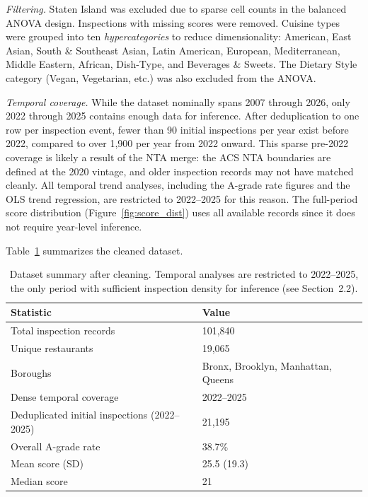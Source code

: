 \documentclass[11pt, twocolumn]{article}
\begin{document}
\textit{Filtering.} Staten Island was excluded due to sparse cell counts
in the balanced ANOVA design. Inspections with missing scores were
removed. Cuisine types were grouped into ten \textit{hypercategories}
to reduce dimensionality: American, East Asian, South \& Southeast Asian,
Latin American, European, Mediterranean, Middle Eastern, African,
Dish-Type, and Beverages \& Sweets. The Dietary Style category
(Vegan, Vegetarian, etc.) was also excluded from the ANOVA.

\textit{Temporal coverage.} While the dataset nominally spans 2007 through
2026, only 2022 through 2025 contains enough data for inference. After
deduplication to one row per inspection event, fewer than 90 initial
inspections per year exist before 2022, compared to over 1,900 per year
from 2022 onward. This sparse pre-2022 coverage is likely a result of the
NTA merge: the ACS NTA boundaries are defined at the 2020 vintage, and
older inspection records may not have matched cleanly. All temporal trend
analyses, including the A-grade rate figures and the OLS trend regression,
are restricted to 2022--2025 for this reason. The full-period score
distribution (Figure~\ref{fig:score_dist}) uses all available records
since it does not require year-level inference.

Table~\ref{tab:summary} summarizes the cleaned dataset.

\begin{table}[t]
  \centering
  \small
  \caption{Dataset summary after cleaning. Temporal analyses are restricted to 2022--2025,
    the only period with sufficient inspection density for inference (see Section~2.2).}
  \label{tab:summary}
  \begin{tabular}{@{}ll@{}}
    \toprule
    Statistic & Value \\
    \midrule
    Total inspection records & 101,840 \\
    Unique restaurants & 19,065 \\
    Boroughs & Bronx, Brooklyn, Manhattan, Queens \\
    Dense temporal coverage & 2022--2025 \\
    Deduplicated initial inspections (2022--2025) & 21,195 \\
    Overall A-grade rate & 38.7\% \\
    Mean score (SD) & 25.5 (19.3) \\
    Median score & 21 \\
    \bottomrule
  \end{tabular}
\end{table}
\end{document}
